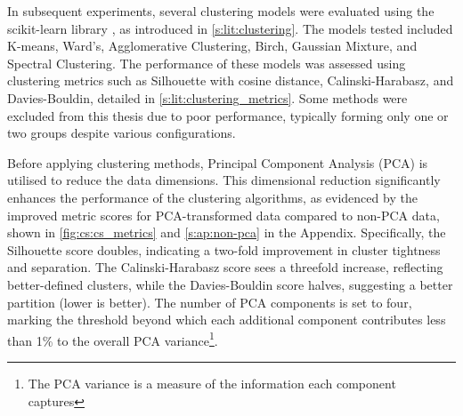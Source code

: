 In subsequent experiments, several clustering models were evaluated using the scikit-learn library \cite{Scikit-learn_undated-ax}, as introduced in \cref{s:lit:clustering}. The models tested included K-means, Ward’s, Agglomerative Clustering, Birch, Gaussian Mixture, and Spectral Clustering. The performance of these models was assessed using clustering metrics such as Silhouette with cosine distance, Calinski-Harabasz, and Davies-Bouldin, detailed in \cref{s:lit:clustering_metrics}. Some methods were excluded from this thesis due to poor performance, typically forming only one or two groups despite various configurations.


Before applying clustering methods, Principal Component Analysis (PCA) is utilised to reduce the data dimensions. This dimensional reduction significantly enhances the performance of the clustering algorithms, as evidenced by the improved metric scores for PCA-transformed data compared to non-PCA data, shown in \cref{fig:cs:cs_metrics} and \cref{s:ap:non-pca} in the Appendix. Specifically, the Silhouette score doubles, indicating a two-fold improvement in cluster tightness and separation. The Calinski-Harabasz score sees a threefold increase, reflecting better-defined clusters, while the Davies-Bouldin score halves, suggesting a better partition (lower is better). The number of PCA components is set to four, marking the threshold beyond which each additional component contributes less than 1\% to the overall PCA variance\footnote{The PCA variance is a measure of the information each component captures}.

